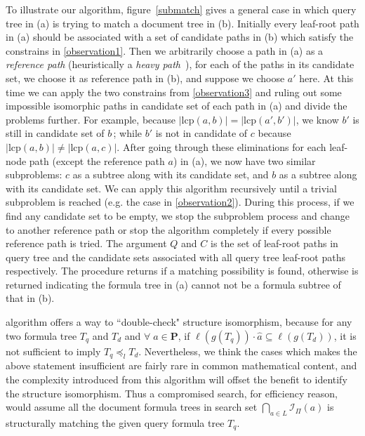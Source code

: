 \documentclass{acm_proc_article-sp}
\begin{document}
To illustrate our  algorithm, figure~\ref{submatch} gives a general case in which query tree in (a) is trying to match a document tree in (b).
Initially every leaf-root path in (a) should be associated with a set of candidate paths in (b) which satisfy the constrains in \ref{observation1}.
Then we arbitrarily choose a path in (a) as a \textit{reference path} (heuristically a \textit{heavy path}~\cite{heavypathde}), for each of the paths in its candidate set, we choose it as reference path in (b), and suppose we choose $a'$ here. At this time we can apply the two constrains from \ref{observation3} and ruling out some impossible isomorphic paths in candidate set of each path in (a) and divide the problems further. 
For example, because $\left| \mathrm{lcp}(a,b) \right| = \left| \mathrm{lcp}(a',b') \right|$, we know $b'$ is still in candidate set of $b\,$; while $b'$ is not in candidate of $c$ because $\left| \mathrm{lcp}(a,b) \right| \neq \left| \mathrm{lcp}(a,c) \right|$. 
After going through these eliminations for each leaf-node path (except the reference path $a$) in (a), we now have two similar subproblems: $c$ as a subtree along with its candidate set, and $b$ as a subtree along with its candidate set. 
We can apply this algorithm recursively until a trivial subproblem is reached (e.g. the case in \ref{observation2}). During this process, if we find any candidate set to be empty, we stop the subproblem process and change to another reference path or stop the algorithm completely if every possible reference path is tried.
The argument $Q$ and $C$ is the set of leaf-root paths in query tree and the candidate sets associated with all query tree leaf-root paths respectively.
The procedure returns  if a matching possibility is found, otherwise  is returned indicating the formula tree in (a) cannot not be a formula subtree of that in (b).

 algorithm offers a way to ``double-check" structure isomorphism, because 
for any two formula tree $T_q$ and $T_d$ and $\forall\; \hat{a} \in \mathbf{P}$, if $\ell(g(T_q)) \cdot \hat{a} \subseteq \ell(g(T_d))$, it is not sufficient to imply $T_q \preceq_l T_d$.
Nevertheless, we think the cases which makes the above statement insufficient are fairly rare in common mathematical content, and the complexity introduced from this algorithm will offset the benefit to identify the structure isomorphism.
Thus a compromised search, for efficiency reason, would assume all the document formula trees in search set
$\bigcap_{a \in L} \mathcal{I}_{\Pi}(a)$ is structurally matching the given query formula tree $T_q$.
\end{document}
